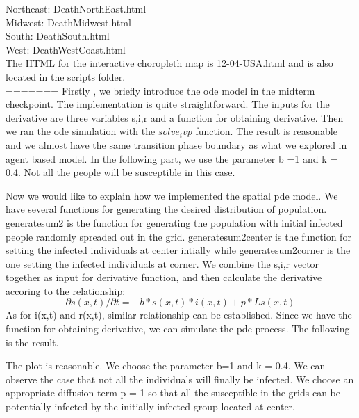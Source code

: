 \documentclass{article}
\begin{document}
Northeast: DeathNorthEast.html\\

Midwest: DeathMidwest.html\\

South: DeathSouth.html\\

West: DeathWestCoast.html\\




\noindent
The HTML for the interactive choropleth map is 12-04-USA.html and is also located in the scripts folder. \\

=======
Firstly , we briefly introduce the ode model in the midterm checkpoint. The implementation is quite straightforward. The inputs for the derivative are three variables s,i,r and a function for obtaining derivative. Then we ran the ode simulation with the $solve_ivp$ function. The result is reasonable and we almost have the same transition phase boundary as what we explored in agent based model. In the following part, we use the parameter b =1 and k = 0.4. Not all the people will be susceptible in this case.

Now we would like to explain how we implemented the spatial pde model. We have several functions for generating the desired distribution of population. generatesum2 is the function for generating the population with initial infected people randomly spreaded out in the grid. generatesum2center is the function for setting the infected individuals at center intially while generatesum2corner is the one setting the infected individuals at corner. We combine the s,i,r vector together as input for derivative function, and then calculate the derivative accoring to the relationship:\\
$$\partial s(x,t)/\partial t = - b*s(x,t)*i(x,t) + p *L  s(x,t)$$
As for i(x,t) and r(x,t), similar relationship can be established. Since we have the function for obtaining derivative, we can simulate the pde process. The following is the result.

The plot is reasonable. We choose the parameter b=1 and k = 0.4. We can observe the case that not all the individuals will finally be infected. We choose an appropriate diffusion term p = 1 so that all the susceptible in the grids can be potentially infected by the initially infected group located at center.
\end{document}
